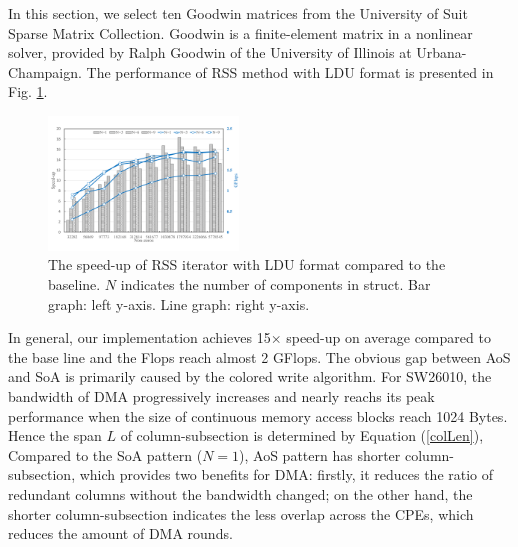 \documentclass[5p,times]{elsarticle}
\begin{document}
In this section, we select ten Goodwin matrices from the University of Suit Sparse Matrix Collection. Goodwin is a finite-element matrix in a nonlinear solver, provided by Ralph Goodwin of the University of Illinois at Urbana-Champaign. The performance of RSS method with LDU format is presented in Fig. \ref{rssldu}.
\begin{figure}[tbp]
\centerline{\includegraphics[width=0.45\textwidth]{rss(ldu)-1.png}}
\caption{The speed-up of RSS iterator with LDU format compared to the baseline. $N$ indicates the number of components in struct. Bar graph: left y-axis. Line graph: right y-axis.}
\label{rssldu}
\end{figure}
In general, our implementation achieves 15$\times$ speed-up on average compared to the base line and the Flops reach almost 2 GFlops. The obvious gap between AoS and SoA is primarily caused by the colored write algorithm. For SW26010, the bandwidth of DMA progressively increases and nearly reachs its peak performance when the size of continuous memory access blocks reach 1024 Bytes. Hence the span $L$ of column-subsection is determined by Equation (\ref{colLen}),
Compared to the SoA pattern ($N=1$), AoS pattern has shorter column-subsection, which provides two benefits for DMA: firstly, it reduces the ratio of redundant columns without the bandwidth changed; on the other hand, the shorter column-subsection indicates the less overlap across the CPEs, which reduces the amount of DMA rounds.
\end{document}
